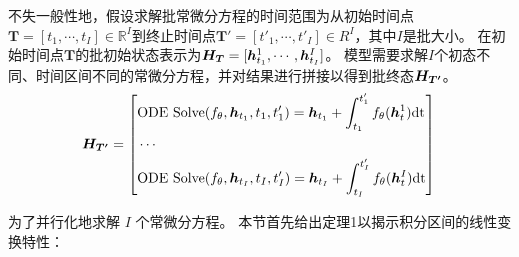 不失一般性地，假设求解批常微分方程的时间范围为从初始时间点$\boldsymbol{T} = [t_1, \cdots,t_I]\in \mathbb{R}^I$到终止时间点$\boldsymbol{T'} = [t' _1, \cdots, t' _I]\in R^I$，其中$I$是批大小。
在初始时间点$\boldsymbol{T}$的批初始状态表示为${\boldsymbol{H}}_{\boldsymbol{T}}=[\boldsymbol{h}_{t_1}^1,\cdots,\boldsymbol{h}_{t_I}^I]$。
模型需要求解$I$个初态不同、时间区间不同的常微分方程，并对结果进行拼接以得到批终态${\boldsymbol{H}}_{\boldsymbol{T'}}$。
\begin{equation}
    \boldsymbol{H}_{\boldsymbol{T'}} = 
    \left[
    \begin{aligned}
  &\text{ODE Solve}(f_\theta, \boldsymbol{h}_{t_1}, t_1, t'_1) = \boldsymbol{h}_{t_1} + \int_{t_{1}}^{t'_1}f_{\theta}(\boldsymbol h^1_t) \text{dt}\\
  &\cdots\\
  &\text{ODE Solve}(f_\theta,\boldsymbol{h}_{t_I}, t_I, t'_I) = \boldsymbol{h}_{t_I} + \int_{t_{I}}^{t'_{I}}f_{\theta}(\boldsymbol h^I_t) \text{dt}
  \end{aligned}
    \right]\\
    \label{equ:solve_all_ode}
\end{equation}

为了并行化地求解 $I$ 个常微分方程。
本节首先给出定理1以揭示积分区间的线性变换特性：

